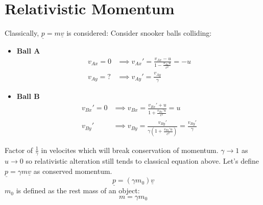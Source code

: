 \documentclass[a4paper, 11pt, normalem]{report}
\begin{document}
\section{Relativistic Momentum}
Classically, $\underline{p} = m\underline{v}$ is considered: 
Consider snooker balls colliding:
\begin{itemize}
    \item \textbf{Ball A}
        \begin{align}
            v_{Ax} = 0 &\implies v_{Ax}' = \frac{v_{Ax} - u}{1 - \tfrac{v_{Ax}u}{c^{2}}} = -u \\
            v_{Ay} = ? &\implies v_{Ay}' = \frac{v_{Ay}}{\gamma}
        \end{align}
    \item \textbf{Ball B}
        \begin{align}
            v_{Bx}' = 0 &\implies v_{Bx} = \frac{v_{Bx}' + u}{1 + \tfrac{v_{Bx}'u}{c^{2}}} = u \\
            v_{By}' &\implies v_{By} = \frac{v_{By}'}{\gamma(1 + \tfrac{v_{Bx}'u}{c^{2}})} = \frac{v_{By}'}{\gamma}
        \end{align}
\end{itemize}
Factor of $\frac{1}{\gamma}$ in velocites which will break conservation of momentum.
$\gamma \rightarrow 1$ as $u \rightarrow 0$ so relativistic alteration still tends to classical equation above.
Let's define $\underline{p} = \gamma m\underline{v}$ as conserved momentum.
\begin{equation}
    \underline{p} = (\gamma m_{0})\underline{v}
\end{equation}
$m_{0}$ is defined as the rest mass of an object:
\begin{equation}
    m = \gamma m_{0}
\end{equation}
\end{document}
